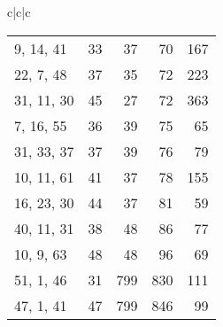 \documentclass{acmsmalltr}
\newcommand{\xst}[3]{#1, #2, #3}
\begin{document}
\begin{sidewaystable}
{\begin{tabular}{c|c|c}
\begin{tabular}{l|rr|r|r}
\xst{9}{14}{41} & 33 & 37 & 70 & 167\\
\xst{22}{7}{48} & 37 & 35 & 72 & 223\\
\xst{31}{11}{30} & 45 & 27 & 72 & 363\\
\xst{7}{16}{55} & 36 & 39 & 75 & 65\\
\xst{31}{33}{37} & 37 & 39 & 76 & 79\\
\xst{10}{11}{61} & 41 & 37 & 78 & 155\\
\xst{16}{23}{30} & 44 & 37 & 81 & 59\\
\xst{40}{11}{31} & 38 & 48 & 86 & 77\\
\xst{10}{9}{63} & 48 & 48 & 96 & 69\\
\xst{51}{1}{46} & 31 & 799 & 830 & 111\\
\xst{47}{1}{41} & 47 & 799 & 846 & 99\\
\end{tabular}
\end{tabular}}
\end{sidewaystable}
\end{document}
